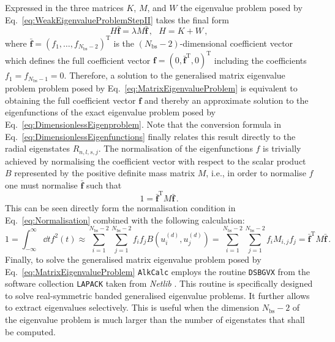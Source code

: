 \documentclass[fontsize=12pt,
               twoside=false,
               BCOR=0mm,
               DIV=14,
               overfullrule=false, %
               toc=bibliography,
               headinclude=true,
               footinclude=false]{scrartcl}
\numberwithin{equation}{section}
\newcommand{\alkcalc}{\texttt{AlkCalc} }
\begin{document}
    Expressed in the three matrices $K$, $M$, and $W$ the eigenvalue problem
    posed by Eq.~\eqref{eq:WeakEigenvalueProblemStepII} takes the final form
    \begin{equation}\label{eq:MatrixEigenvalueProblem}
        H \bar{\bm{f}} = \lambda M \bar{\bm{f}}
    \,, \ \ \
        H = K + W
    \,,
    \end{equation}
    where $\bar{\bm{f}}=(f_1,\dots,f_{N_\mathrm{bs}-2})^\mathrm{T}$ is the
    $(N_\mathrm{bs}-2)$-dimensional coefficient vector which defines the full
    coefficient vector $\bm{f}=(0,\bar{\bm{f}}^\mathrm{T},0)^\mathrm{T}$
    including the coefficients $f_1=f_{N_\mathrm{bs}-1}=0$. Therefore, a
    solution to the generalised matrix eigenvalue problem problem posed by
    Eq.~\eqref{eq:MatrixEigenvalueProblem} is equivalent to obtaining the full
    coefficient vector $\bm{f}$ and thereby an approximate solution to the
    eigenfunctions of the exact eigenvalue problem posed by
    Eq.~\eqref{eq:DimensionlessEigenproblem}. Note that the conversion formula
    in Eq.~\eqref{eq:DimensionlessEigenfunctions} finally relates this result
    directly to the radial eigenstates $R_{n,l,s,j}$. The normalisation of the
    eigenfunctions $f$ is trivially achieved by normalising the coefficient
    vector with respect to the scalar product $B$ represented by the positive
    definite mass matrix $M$, i.e., in order to normalise $f$ one must normalise
    $\bar{\bm{f}}$ such that
    \begin{equation}
        1 = \bar{\bm{f}}^\mathrm{T} M \bar{\bm{f}}
    \,.
    \end{equation}
    This can be seen directly form the normalisation condition in
    Eq.~\eqref{eq:Normalisation} combined with the following calculation:
    \begin{equation}
        1
        =
        \int^\infty_{-\infty} \dd{t} f^2(t)
        \approx
        \sum^{N_\mathrm{bs}-2}_{i=1}
        \sum^{N_\mathrm{bs}-2}_{j=1}
        f_i f_j B(u^{(d)}_i,u^{(d)}_j)
        =
        \sum^{N_\mathrm{bs}-2}_{i=1}
        \sum^{N_\mathrm{bs}-2}_{j=1}
        f_i M_{i,j} f_j
        =
        \bar{\bm{f}}^\mathrm{T} M \bar{\bm{f}}
    \,.
    \end{equation}
    Finally, to solve the generalised matrix eigenvalue problem posed by
    Eq.~\eqref{eq:MatrixEigenvalueProblem} \alkcalc employs the routine
    \texttt{DSBGVX} from the software collection \texttt{LAPACK}
    \cite{anderson1999} taken from \emph{Netlib} \cite{dongarra1987}. This
    routine is specifically designed to solve real-symmetric banded generalised
    eigenvalue problems. It further allows to extract eigenvalues selectively.
    This is useful when the dimension $N_\mathrm{bs}-2$ of the eigenvalue
    problem is much larger than the number of eigenstates that shall be
    computed.
\end{document}
